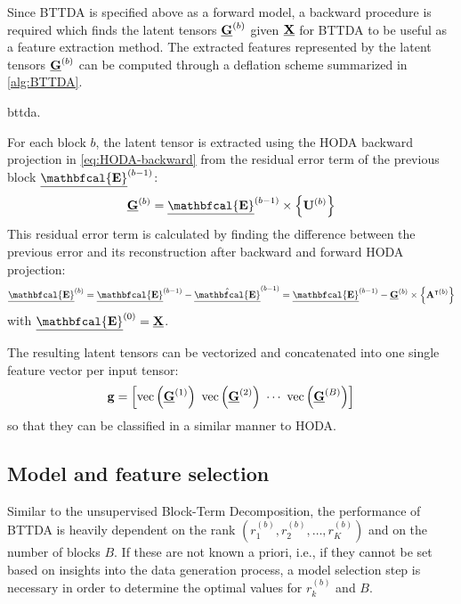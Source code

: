 Since BTTDA is specified above as a forward model, a backward procedure
is required which finds the latent tensors $\underline{\mathbf{G}}^{(b)}$ given $\underline{\mathbf{X}}$ for
BTTDA to be useful as a feature extraction method.
The extracted features represented by the latent tensors $\underline{\mathbf{G}}^{(b)}$ can be
computed through a deflation scheme summarized in \cref{alg:BTTDA}.
\begin{algorithm}
  \caption[A \acs{bttda} feature extraction.]{\Ac{bttda}.}
	\label{alg:BTTDA}
	
\end{algorithm}
For each block $b$, the latent tensor is extracted using the HODA backward
projection in \cref{eq:HODA-backward} from the residual error term of the previous
block $\ten{\mathbfcal{E}}^{(b-1)}$:
\begin{equation}
	\ten{G}^{(b)} = \ten{\mathbfcal{E}}^{(b-1)}\mmpr{\mat{U}^{(b)}}
\end{equation}
This residual error term is calculated by finding the difference between the
previous error and its reconstruction after backward and forward HODA
projection:
\begin{equation}
  \ten{\mathbfcal{E}}^{(b)}
  = \ten{\mathbfcal{E}}^{(b-1)} - \hat{\ten{\mathbfcal{E}}}^{(b-1)}
  = \ten{\mathbfcal{E}}^{(b-1)} - \ten{G}^{(b)}\mmpr{\mat{A}^{\intercal(b)}}
\end{equation}
with $\ten{\mathbfcal{E}}^{(0)}=\ten{X}$.

The resulting latent tensors can be vectorized and concatenated into
one single feature vector per input tensor:
\begin{equation}
	\mathbf{g}
	=\left[\operatorname{vec}\left(\underline{\mathbf{G}}^{(1)}\right)\
		\operatorname{vec}\left(\underline{\mathbf{G}}^{(2)}\right)\
		\cdots\
		\operatorname{vec}\left(\underline{\mathbf{G}}^{(B)}\right)\right]
\end{equation}
so that they can be classified in a similar manner to HODA.


\subsection{Model and feature selection}
Similar to the unsupervised Block-Term Decomposition, the performance of BTTDA is
heavily dependent on the rank $(r_1^{(b)}, r_2^{(b)}, \ldots,
	r_K^{(b)})$ and on the number of blocks $B$.
If these are not known a priori, i.e., if they cannot be set based on insights into the
data generation process, a model selection step is necessary in order to
determine the optimal values for $r_k^{(b)}$ and $B$.

